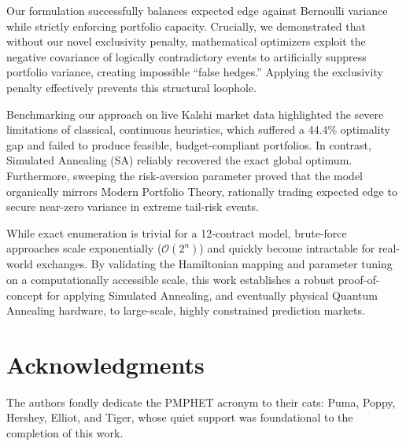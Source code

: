 \documentclass[aps, reprint, prl, twocolumn, superscriptaddress,amsmath,amssymb,noeprint]{revtex4-2}
\begin{document}
Our formulation successfully balances expected edge against Bernoulli variance while strictly enforcing portfolio capacity. Crucially, we demonstrated that without our novel exclusivity penalty, mathematical optimizers exploit the negative covariance of logically contradictory events to artificially suppress portfolio variance, creating impossible ``false hedges.'' Applying the exclusivity penalty effectively prevents this structural loophole.

Benchmarking our approach on live Kalshi market data highlighted the severe limitations of classical, continuous heuristics, which suffered a 44.4\% optimality gap and failed to produce feasible, budget-compliant portfolios. In contrast, Simulated Annealing (SA) reliably recovered the exact global optimum. Furthermore, sweeping the risk-aversion parameter proved that the model organically mirrors Modern Portfolio Theory, rationally trading expected edge to secure near-zero variance in extreme tail-risk events. 

While exact enumeration is trivial for a 12-contract model, brute-force approaches scale exponentially ($\mathcal{O}(2^n)$) and quickly become intractable for real-world exchanges. By validating the Hamiltonian mapping and parameter tuning on a computationally accessible scale, this work establishes a robust proof-of-concept for applying Simulated Annealing, and eventually physical Quantum Annealing hardware, to large-scale, highly constrained prediction markets.


\section*{Acknowledgments}
The authors fondly dedicate the PMPHET acronym to their cats: Puma, Poppy, Hershey, Elliot, and Tiger, whose quiet support was foundational to the completion of this work.
\end{document}
